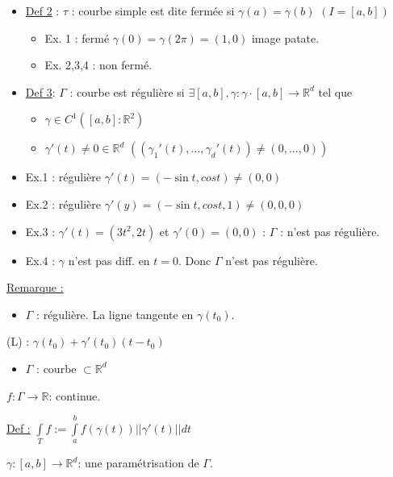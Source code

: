 \documentclass[11pt]{article}
\begin{document}
\begin{itemize}
\item \uline{Def 2} : \(\tau\) : courbe simple est dite fermée si \(\gamma(a) = \gamma(b)\) \(\left(I = \left[a,b\right]\right)\)
\begin{itemize}
\item Ex. 1 : fermé \(\gamma(0)=\gamma(2\pi) = (1,0)\) image patate.
\item Ex. 2,3,4 : non fermé.
\end{itemize}

\item \uline{Def 3}: \(\Gamma\) : courbe est régulière si \(\exists \left[a,b\right], \gamma: \gamma \cdot \left[a,b\right] \rightarrow \mathbb{R}^d\) tel que
\begin{itemize}
\item \(\gamma \in C^1 \left(\left[a,b\right]: \mathbb{R}^2\right)\)
\item \(\gamma ' (t) \neq 0 \in \mathbb{R}^d\) \(\left( \left(\gamma_1'(t),...,\gamma_d'(t) \right) \neq (0,...,0) \right)\)
\end{itemize}

\item Ex.1 : régulière \(\gamma'(t) = (-\sin t, cos t) \neq (0,0)\)
\item Ex.2 : régulière \(\gamma'(y) = (-\sin t, cos t, 1) \neq (0,0,0)\)
\item Ex.3 : \(\gamma' (t) = (3t^2,2t)\) et \(\gamma'(0) = (0,0)\) : \(\Gamma\) : n'est pas régulière.
\item Ex.4 : \(\gamma\) n'est pas diff. en \(t=0\). Donc \(\Gamma\) n'est pas régulière.
\end{itemize}

\uline{Remarque :}
\begin{itemize}
\item \(\Gamma\) : régulière. La ligne tangente en \(\gamma(t_0)\).
\end{itemize}

(L) : \(\gamma(t_0) + \gamma'(t_0)(t-t_0)\)

\begin{itemize}
\item \(\Gamma\) : courbe \(\subset \mathbb{R}^d\)
\end{itemize}

\(f: \Gamma \rightarrow \mathbb{R}\): continue.

\uline{Def :} \(\int\limits_{T} f := \int\limits_{a}^{b} f(\gamma(t)) ||\gamma'(t)|| dt\)

\(\gamma : \left[a,b\right] \rightarrow \mathbb{R}^d\): une paramétrisation de \(\Gamma\).
\end{document}
